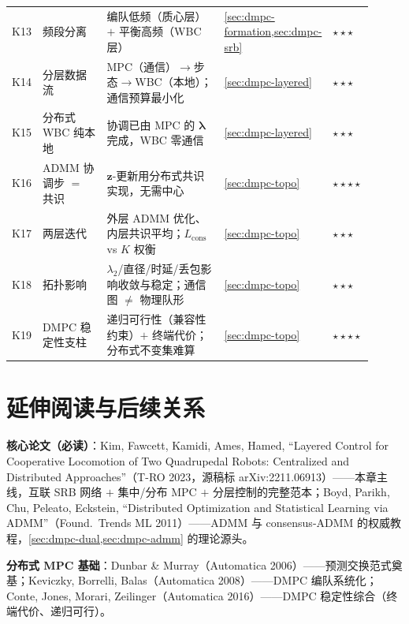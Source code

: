 \begin{table}[H]
\begin{tabular}{p{0.05\linewidth}p{0.22\linewidth}p{0.50\linewidth}p{0.10\linewidth}p{0.04\linewidth}}
K13 & 频段分离 & 编队低频（质心层）$+$ 平衡高频（WBC 层） & \cref{sec:dmpc-formation,sec:dmpc-srb} & $\star\star\star$ \\
K14 & 分层数据流 & MPC（通信）$\to$步态$\to$WBC（本地）；通信预算最小化 & \cref{sec:dmpc-layered} & $\star\star\star$ \\
K15 & 分布式 WBC 纯本地 & 协调已由 MPC 的 $\boldsymbol{\lambda}$ 完成，WBC 零通信 & \cref{sec:dmpc-layered} & $\star\star\star$ \\
K16 & ADMM 协调步 $=$ 共识 & $\mathbf{z}$-更新用分布式共识实现，无需中心 & \cref{sec:dmpc-topo} & $\star\star\star\star$ \\
K17 & 两层迭代 & 外层 ADMM 优化、内层共识平均；$L_{\text{cons}}$ vs $K$ 权衡 & \cref{sec:dmpc-topo} & $\star\star\star$ \\
K18 & 拓扑影响 & $\lambda_2$/直径/时延/丢包影响收敛与稳定；通信图 $\ne$ 物理队形 & \cref{sec:dmpc-topo} & $\star\star\star$ \\
K19 & DMPC 稳定性支柱 & 递归可行性（兼容性约束）$+$ 终端代价；分布式不变集难算 & \cref{sec:dmpc-topo} & $\star\star\star\star$ \\
\bottomrule
\end{tabular}
\end{table}

\section*{延伸阅读与后续关系}
\label{sec:dmpc-further}

\textbf{核心论文（必读）}：Kim, Fawcett, Kamidi, Ames, Hamed, ``Layered Control for Cooperative Locomotion of Two Quadrupedal Robots: Centralized and Distributed Approaches''（T-RO 2023\cite{kim2023layered}，源稿标 arXiv:2211.06913）——本章主线，互联 SRB 网络 $+$ 集中/分布 MPC $+$ 分层控制的完整范本；Boyd, Parikh, Chu, Peleato, Eckstein, ``Distributed Optimization and Statistical Learning via ADMM''（Found.\ Trends ML 2011\cite{boyd2011admm}）——ADMM 与 consensus-ADMM 的权威教程，\cref{sec:dmpc-dual,sec:dmpc-admm} 的理论源头。

\textbf{分布式 MPC 基础}：Dunbar \& Murray（Automatica 2006\cite{dunbar2006distributed}）——预测交换范式奠基；Keviczky, Borrelli, Balas（Automatica 2008\cite{keviczky2008decentralized}）——DMPC 编队系统化；Conte, Jones, Morari, Zeilinger（Automatica 2016\cite{conte2016distributed}）——DMPC 稳定性综合（终端代价、递归可行）。


